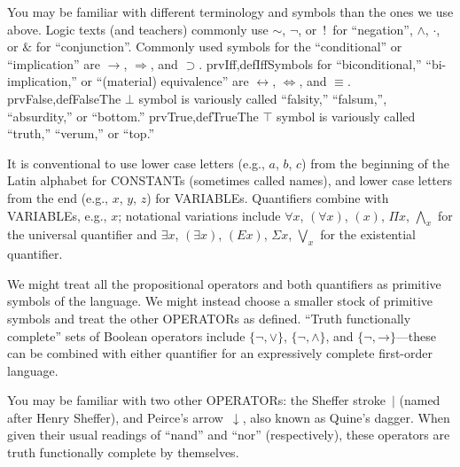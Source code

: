 \documentclass[10pt,a4paper]{article}
\newcommand*{\olup}[1]{\MakeUppercase{#1}}
\theoremstyle{plain}
\theoremstyle{definition}
\theoremstyle{remark}
\newenvironment{explain}{}{}
\providecommand{\lif}{\mathbin{\rightarrow}}
\providecommand{\ltrue}{\top}
\providecommand{\lfalse}{\bot}
\providecommand{\iftag}[1]{#1}
\providecommand{\iftag}{}
\begin{document}
\begin{intro}
You may be familiar with different terminology and symbols than the
ones we use above. Logic texts (and teachers) commonly use 
$\sim$, $\neg$, or~!\ for ``negation'', $\wedge$, $\cdot$, or $\&$
for ``conjunction''.  Commonly used symbols for the ``conditional'' or
``implication'' are $\rightarrow$, $\Rightarrow$, and $\supset$.
\iftag{prvIff,defIff}{Symbols for ``biconditional,'' ``bi-implication,''
  or ``(material) equivalence'' are $\leftrightarrow$,
  $\Leftrightarrow$, and $\equiv$.}{}
\iftag{prvFalse,defFalse}{The $\lfalse$ symbol is variously called
  ``falsity,'' ``falsum,'', ``absurdity,'' or ``bottom.''}{}
\iftag{prvTrue,defTrue}{The $\ltrue$ symbol is variously called
  ``truth,'' ``verum,'' or ``top.''}{}

It is conventional to use lower case letters (e.g., $a$, $b$, $c$) from
the beginning of the Latin alphabet for \olup{constant}s (sometimes called
names), and lower case letters from the end (e.g., $x$, $y$, $z$) for
\olup{variable}s. Quantifiers combine with \olup{variable}s, e.g., $x$;
notational variations include $\forall x$, $(\forall x)$, $(x)$, $\Pi x$,
$\bigwedge_x$ for the universal quantifier and $\exists x$, $(\exists
x)$, $(Ex)$, $\Sigma x$, $\bigvee_x$ for the existential quantifier.
\end{intro}

\begin{explain}
We might treat all the propositional operators and both quantifiers as
primitive symbols of the language.  We might instead choose a smaller
stock of primitive symbols and treat the other \olup{operator}s as
defined. ``Truth functionally complete'' sets of Boolean operators
include $\{ \lnot, \lor \}$, $\{ \lnot, \land \}$, and $\{ \lnot,
\lif\}$---these can be combined with either quantifier for an
expressively complete first-order language.

You may be familiar with two other \olup{operator}s: the Sheffer
stroke~$|$ (named after Henry Sheffer), and Peirce's
arrow~$\downarrow$, also known as Quine's dagger.  When given their
usual readings of ``nand'' and ``nor'' (respectively), these operators
are truth functionally complete by themselves.
\end{explain}


\end{document}
